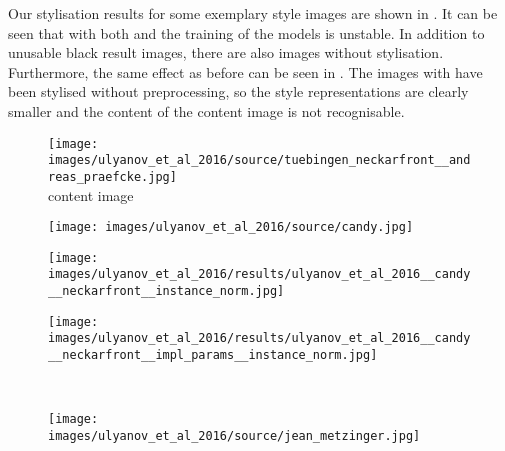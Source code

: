 Our stylisation results for some exemplary style images are shown in . It can be seen that with both \paper{} and \implementation{} the training of the models is unstable. In addition to unusable black result images, there are also images without stylisation. Furthermore, the same effect as before can be seen in . The images with \paper{} have been stylised without preprocessing, so the style representations are clearly smaller and the content of the content image is not recognisable.
\begin{figure}[H]
	\centering
	\begin{minipage}[t]{0.24\textwidth}
		\centering
		\texttt{[image: images/ulyanov\_et\_al\_2016/source/tuebingen\_neckarfront\_\_andreas\_praefcke.jpg]}\\
		content image
	\end{minipage}
	\hfill%
	\begin{minipage}[t]{0.24\textwidth}
		\centering
		\hfill
	\end{minipage}
	\hfill%
	\begin{minipage}[t]{0.24\textwidth}
		\centering
		\hfill
	\end{minipage}
	\hfill%
	\begin{minipage}[t]{0.24\textwidth}
		\centering
		\hfill
	\end{minipage}
	\hfill%
	\begin{minipage}[t]{0.24\textwidth}
		\centering
		\texttt{[image: images/ulyanov\_et\_al\_2016/source/candy.jpg]}
	\end{minipage}
	\hfill%
	\begin{minipage}[t]{0.24\textwidth}
		\centering
		\texttt{[image: images/ulyanov\_et\_al\_2016/results/ulyanov\_et\_al\_2016\_\_candy\_\_neckarfront\_\_instance\_norm.jpg]}
	\end{minipage}
	\hfill%
	\begin{minipage}[t]{0.24\textwidth}
		\centering
		\texttt{[image: images/ulyanov\_et\_al\_2016/results/ulyanov\_et\_al\_2016\_\_candy\_\_neckarfront\_\_impl\_params\_\_instance\_norm.jpg]}
	\end{minipage}
	\hfill%
	\\
	\begin{minipage}[t]{0.24\textwidth}
		\centering
		\texttt{[image: images/ulyanov\_et\_al\_2016/source/jean\_metzinger.jpg]}
	\end{minipage}
	\hfill%
	\begin{minipage}[t]{0.24\textwidth}

\end{minipage}
\end{figure}
